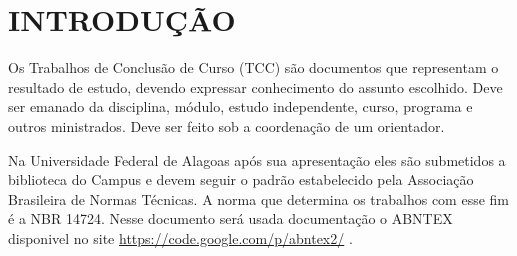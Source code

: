 %
%
\chapter{INTRODUÇÃO}\label{chap:introducao}


Os Trabalhos de Conclusão de Curso (TCC) são documentos que
representam o resultado de estudo, devendo expressar conhecimento do assunto escolhido. Deve ser emanado da disciplina, módulo, estudo independente, curso, programa e outros ministrados. Deve ser feito sob a coordenação de um orientador.

Na Universidade Federal de Alagoas após sua apresentação
eles são submetidos a biblioteca do Campus e devem seguir o padrão estabelecido pela Associação Brasileira de Normas Técnicas. A norma que determina os trabalhos com esse fim é a NBR 14724. Nesse documento será usada documentação o ABNTEX disponivel no site \href{https://code.google.com/p/abntex2/}{https://code.google.com/p/abntex2/} .

